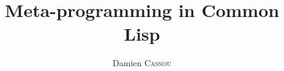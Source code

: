 \documentclass[14pt]{beamer}
\title{Meta-programming in Common Lisp}
\author{Damien \textsc{Cassou}}
\institute
{
Software Architecture Group
}
\date{%
}
\begin{document}
\begin{frame}[plain] %
  \titlepage
\end{frame}


\end{document}
